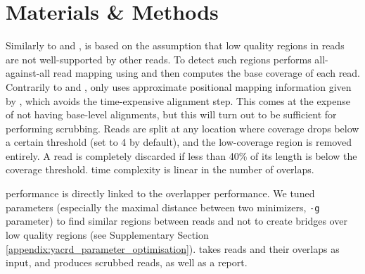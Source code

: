\documentclass[./main.tex]{subfiles}
\begin{document}

\section{Materials \& Methods}

Similarly to \dascrubber and \miniscrub, \textbf{\yacrd} is based on the assumption that low quality regions in reads are not well-supported by other reads. To detect such regions \yacrd performs all-against-all read mapping using \minimap and then computes the base coverage of each read. Contrarily to \dascrubber and \miniscrub, \yacrd  only uses approximate positional mapping information given by \minimap, which avoids the time-expensive alignment step. This comes at the expense of not having base-level alignments, but this will turn out to be sufficient for performing scrubbing. Reads are split at any location where coverage drops below a certain threshold (set to 4 by default), and the low-coverage region is removed entirely. A read is completely discarded if less than 40\% of its length is below the coverage threshold. \yacrd time complexity is linear in the number of overlaps.

\yacrd performance is directly linked to the overlapper performance. We tuned \minimap parameters (especially the maximal distance between two minimizers, \texttt{-g} parameter) to find similar regions between reads and not to create bridges over low quality regions (see Supplementary Section \ref{appendix:yacrd_parameter_optimisation}).
\yacrd takes reads and their overlaps as input, and produces scrubbed reads, as well as a report. %
\end{document}
